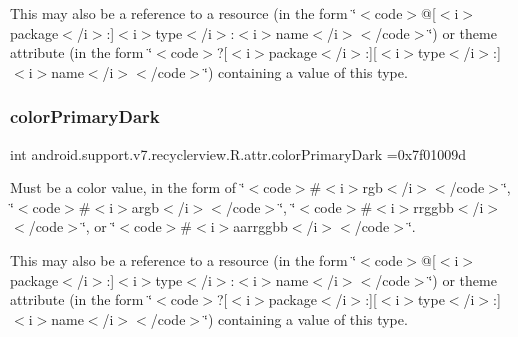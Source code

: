 This may also be a reference to a resource (in the form \char`\"{}$<$code$>$@\mbox{[}$<$i$>$package$<$/i$>$\+:\mbox{]}$<$i$>$type$<$/i$>$\+:$<$i$>$name$<$/i$>$$<$/code$>$\char`\"{}) or theme attribute (in the form \char`\"{}$<$code$>$?\mbox{[}$<$i$>$package$<$/i$>$\+:\mbox{]}\mbox{[}$<$i$>$type$<$/i$>$\+:\mbox{]}$<$i$>$name$<$/i$>$$<$/code$>$\char`\"{}) containing a value of this type. \mbox{\label{classandroid_1_1support_1_1v7_1_1recyclerview_1_1R_1_1attr_a7f6fd72e821021b93f78c8633340e2b8}} 
\subsubsection{\texorpdfstring{color\+Primary\+Dark}{colorPrimaryDark}}
{\footnotesize\ttfamily int android.\+support.\+v7.\+recyclerview.\+R.\+attr.\+color\+Primary\+Dark =0x7f01009d\hspace{0.3cm}{\ttfamily [static]}}

Must be a color value, in the form of \char`\"{}$<$code$>$\#$<$i$>$rgb$<$/i$>$$<$/code$>$\char`\"{}, \char`\"{}$<$code$>$\#$<$i$>$argb$<$/i$>$$<$/code$>$\char`\"{}, \char`\"{}$<$code$>$\#$<$i$>$rrggbb$<$/i$>$$<$/code$>$\char`\"{}, or \char`\"{}$<$code$>$\#$<$i$>$aarrggbb$<$/i$>$$<$/code$>$\char`\"{}. 

This may also be a reference to a resource (in the form \char`\"{}$<$code$>$@\mbox{[}$<$i$>$package$<$/i$>$\+:\mbox{]}$<$i$>$type$<$/i$>$\+:$<$i$>$name$<$/i$>$$<$/code$>$\char`\"{}) or theme attribute (in the form \char`\"{}$<$code$>$?\mbox{[}$<$i$>$package$<$/i$>$\+:\mbox{]}\mbox{[}$<$i$>$type$<$/i$>$\+:\mbox{]}$<$i$>$name$<$/i$>$$<$/code$>$\char`\"{}) containing a value of this type. \mbox{\label{classandroid_1_1support_1_1v7_1_1recyclerview_1_1R_1_1attr_a63b367a27143e06ba487c59d338837b3}} 
